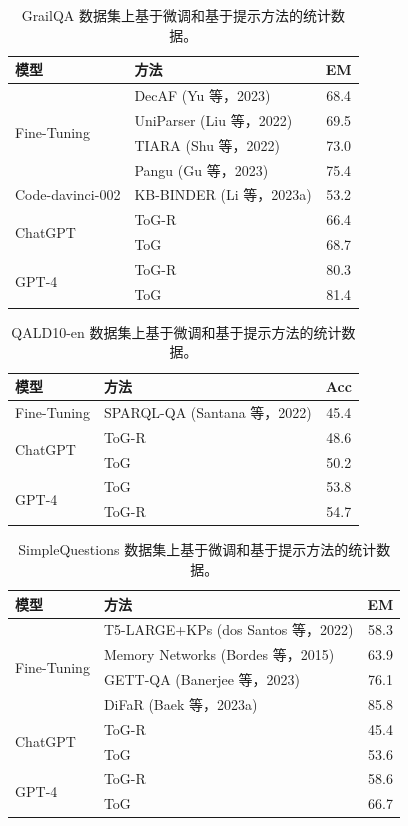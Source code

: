 \documentclass[11pt,UTF8,fontset=fandol]{ctexart}
\begin{document}
\begin{table}[H]\centering
\caption{GrailQA 数据集上基于微调和基于提示方法的统计数据。}
\label{tab:12}
\small
\begin{tabular}{llc}
\toprule
模型 & 方法 & EM \\
\midrule
\multirow{4}{*}{Fine-Tuning} & DecAF (Yu 等，2023) & 68.4 \\
& UniParser (Liu 等，2022) & 69.5 \\
& TIARA (Shu 等，2022) & 73.0 \\
& Pangu (Gu 等，2023) & 75.4 \\
\midrule
Code-davinci-002 & KB-BINDER (Li 等，2023a) & 53.2 \\
\midrule
\multirow{2}{*}{ChatGPT} & ToG-R & 66.4 \\
& ToG & 68.7 \\
\midrule
\multirow{2}{*}{GPT-4} & ToG-R & 80.3 \\
& ToG & 81.4 \\
\bottomrule
\end{tabular}
\end{table}

\begin{table}[H]\centering
\caption{QALD10-en 数据集上基于微调和基于提示方法的统计数据。}
\label{tab:13}
\small
\begin{tabular}{llc}
\toprule
模型 & 方法 & Acc \\
\midrule
Fine-Tuning & SPARQL-QA (Santana 等，2022) & 45.4 \\
\midrule
\multirow{2}{*}{ChatGPT} & ToG-R & 48.6 \\
& ToG & 50.2 \\
\midrule
\multirow{2}{*}{GPT-4} & ToG & 53.8 \\
& ToG-R & 54.7 \\
\bottomrule
\end{tabular}
\end{table}

\begin{table}[H]\centering
\caption{SimpleQuestions 数据集上基于微调和基于提示方法的统计数据。}
\label{tab:14}
\small
\begin{tabular}{llc}
\toprule
模型 & 方法 & EM \\
\midrule
\multirow{4}{*}{Fine-Tuning} & T5-LARGE+KPs (dos Santos 等，2022) & 58.3 \\
& Memory Networks (Bordes 等，2015) & 63.9 \\
& GETT-QA (Banerjee 等，2023) & 76.1 \\
& DiFaR (Baek 等，2023a) & 85.8 \\
\midrule
\multirow{2}{*}{ChatGPT} & ToG-R & 45.4 \\
& ToG & 53.6 \\
\midrule
\multirow{2}{*}{GPT-4} & ToG-R & 58.6 \\
& ToG & 66.7 \\
\bottomrule
\end{tabular}
\end{table}
\end{document}
